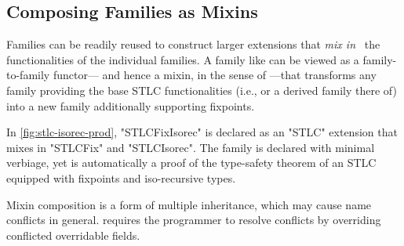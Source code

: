 \subsection{Composing Families as Mixins}
\label{sec:mixin}


Families can be readily reused to construct larger extensions that
\emph{mix in}~\cite{mixin-1990} the functionalities of the individual
families.
A family like  can be viewed as a family-to-family functor---%
and hence a mixin, in the sense of \cite{flatt1998mixin}---that
transforms any family providing the base STLC functionalities
(i.e.,  or a derived family there of) into a new
family additionally supporting fixpoints.

In \cref{fig:stlc-isorec-prod}, "STLCFixIsorec" is declared as 
an "STLC" extension that mixes in "STLCFix" and "STLCIsorec".
The family is declared with minimal verbiage, yet
 is automatically a proof of the type-safety
theorem of an STLC equipped with fixpoints and iso-recursive types.

Mixin composition is a form of multiple inheritance, which may cause
name conflicts in general. %
\Lang requires the programmer to resolve conflicts by
overriding conflicted overridable fields.

